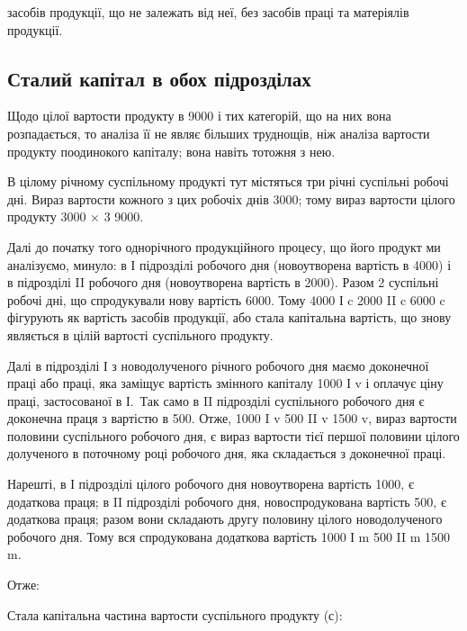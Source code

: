 \parcont{}  %
засобів продукції, що не залежать від неї, без засобів праці та матеріялів
продукції.

\subsection{Сталий капітал в обох підрозділах}

Щодо цілої вартости продукту в 9000 і тих категорій, що на них
вона розпадається, то аналіза її не являє більших труднощів, ніж аналіза
вартости продукту поодинокого капіталу; вона навіть тотожня з нею.

В цілому річному суспільному продукті тут містяться три річні суспільні
робочі дні. Вираз вартости кожного з цих робочіх днів \deq{} 3000; тому
вираз вартости цілого продукту 3000 × 3 \deq{} 9000.

Далі до початку того однорічного продукційного процесу, що його
продукт ми аналізуємо, минуло: в І підрозділі  робочого дня (новоутворена
вартість в 4000) і в підрозділі II  робочого дня (новоутворена
вартість в 2000). Разом 2 суспільні робочі дні, що спродукували
нову вартість \deq{} 6000. Тому 4000 І c \dplus{} 2000 II c \deq{} 6000 c фігурують
як вартість засобів продукції, або стала капітальна вартість, що
знову являється в цілій вартості суспільного продукту.

Далі в підрозділі І з новодолученого річного робочого дня маємо 
доконечної праці або праці, яка заміщує вартість змінного капіталу 1000
І v і оплачує ціну праці, застосованої в І.~Так само в II підрозділі  суспільного
робочого дня є доконечна праця з вартістю в 500. Отже, 1000
I v \dplus{} 500 II v \deq{} 1500 v, вираз вартости половини суспільного робочого
дня, є вираз вартости тієї першої половини цілого долученого в поточному
році робочого дня, яка складається з доконечної праці.

Нарешті, в І підрозділі  цілого робочого дня новоутворена вартість \deq{}
1000, є додаткова праця; в II підрозділі  робочого дня, новоспродукована
вартість \deq{} 500, є додаткова праця; разом вони складають другу
половину цілого новодолученого робочого дня. Тому вся спродукована
додаткова вартість \deq{} 1000 І m \dplus{} 500 II m \deq{} 1500 m.

Отже:

Стала капітальна частина вартости суспільного продукту (с):

